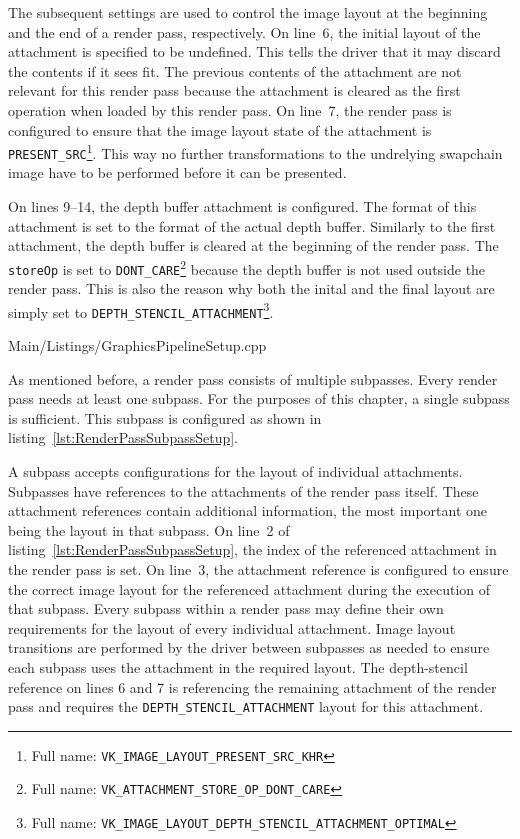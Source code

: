         The subsequent settings are used to control the image layout at the beginning and the end of a render pass, respectively.
        On line~6, the initial layout of the attachment is specified to be undefined.
        This tells the \gls{driver} that it may discard the contents if it sees fit.
        The previous contents of the attachment are not relevant for this render pass because the attachment is cleared as the first operation when loaded by this render pass.
        On line~7, the render pass is configured to ensure that the image layout state of the attachment is \lstinline{PRESENT_SRC}\footnote{Full name: \lstinline{VK_IMAGE_LAYOUT_PRESENT_SRC_KHR}}.
        This way no further transformations to the undrelying swapchain image have to be performed before it can be presented.

        On lines 9--14, the depth buffer attachment is configured.
        The format of this attachment is set to the format of the actual depth buffer.
        Similarly to the first attachment, the depth buffer is cleared at the beginning of the render pass.
        The \lstinline{storeOp} is set to \lstinline{DONT_CARE}\footnote{Full name: \lstinline{VK_ATTACHMENT_STORE_OP_DONT_CARE}} because the depth buffer is not used outside the render pass.
        This is also the reason why both the inital and the final layout are simply set to \lstinline{DEPTH_STENCIL_ATTACHMENT}\footnote{Full name: \lstinline{VK_IMAGE_LAYOUT_DEPTH_STENCIL_ATTACHMENT_OPTIMAL}}.

        
        {Main/Listings/GraphicsPipelineSetup.cpp}

        As mentioned before, a render pass consists of multiple subpasses.
        Every render pass needs at least one subpass.
        For the purposes of this chapter, a single subpass is sufficient.
        This subpass is configured as shown in listing~\ref{lst:RenderPassSubpassSetup}.

        A subpass accepts configurations for the layout of individual attachments.
        Subpasses have references to the attachments of the render pass itself.
        These attachment references contain additional information, the most important one being the layout in that subpass.
        On line~2 of listing~\ref{lst:RenderPassSubpassSetup}, the index of the referenced attachment in the render pass is set.
        On line~3, the attachment reference is configured to ensure the correct image layout for the referenced attachment during the execution of that subpass.
        Every subpass within a render pass may define their own requirements for the layout of every individual attachment.
        Image layout transitions are performed by the \gls{driver} between subpasses as needed to ensure each subpass uses the attachment in the required layout.
        The depth-stencil reference on lines 6 and 7 is referencing the remaining attachment of the render pass and requires the \lstinline{DEPTH_STENCIL_ATTACHMENT} layout for this attachment.

